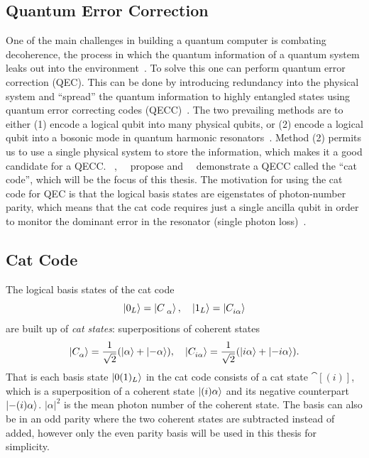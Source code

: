 \documentclass[main.tex]{subfiles}
\begin{document}
\subsection{Quantum Error Correction}
One of the main challenges in building a quantum computer is combating decoherence, the process in which the quantum information of a quantum system leaks out into the environment~\cite{gottesman_introduction_2009}.
To solve this one can perform quantum error correction (QEC).
This can be done by introducing redundancy into the physical system and ``spread'' the quantum information to highly entangled states using quantum error correcting codes (QECC)~\cite{gottesman_introduction_2009}.
The two prevailing methods are to either (1) encode a logical qubit into many physical qubits, or (2) encode a logical qubit into a bosonic mode in quantum harmonic resonators~\cite{}.
Method (2) permits us to use a single physical system to store the information, which makes it a good candidate for a QECC.
\citeauthor{leghtas_hardware-efficient_2013}~\cite{leghtas_hardware-efficient_2013},~\citeauthor{mirrahimi_dynamically_2014}~\cite{mirrahimi_dynamically_2014} propose and~\citeauthor{ofek_extending_2016}~\cite{ofek_extending_2016} demonstrate a QECC called the ``cat code'', which will be the focus of this thesis.
The motivation for using the cat code for QEC is that the logical basis states are eigenstates of photon-number parity, which means that the cat code requires just a single ancilla qubit in order to monitor the dominant
error in the resonator (single photon loss)~\cite{ofek_extending_2016}.

\subsection{Cat Code}%
\label{sec:cat-code}
The logical basis states of the cat code
\begin{equation}
    \ket{0_L} = \cat{},\quad \ket{1_L} = \cat[i]{}
\end{equation}
are built up of \emph{cat states}: superpositions of coherent states
\begin{equation}
	\cat[]{} = \frac{1}{\sqrt{2}}\qty(\ket{\alpha} + \ket{-\alpha}),\quad 
	\cat[i]{} = \frac{1}{\sqrt{2}}\qty(\ket{i\alpha} + \ket{-i\alpha}).
\end{equation}
That is each basis state \( \ket{0(1)_L} \) in the cat code consists of a cat state \(\cat[(i)]{}\), which is a superposition of a coherent state \(\ket{(i)\alpha}\) and its negative counterpart \(\ket{-(i)\alpha}\). \(|\alpha|^2\) is the mean photon number of the coherent state.
The basis can also be in an odd parity where the two coherent states are subtracted instead of added, however only the even parity basis will be used in this thesis for simplicity.
\end{document}
